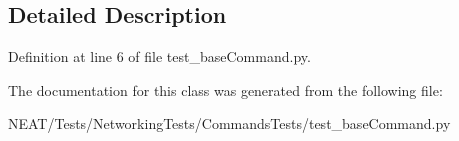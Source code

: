 \subsection{Detailed Description}


Definition at line 6 of file test\+\_\+base\+Command.\+py.



The documentation for this class was generated from the following file\+:\begin{DoxyCompactItemize}
\item 
N\+E\+A\+T/\+Tests/\+Networking\+Tests/\+Commands\+Tests/test\+\_\+base\+Command.\+py\end{DoxyCompactItemize}
